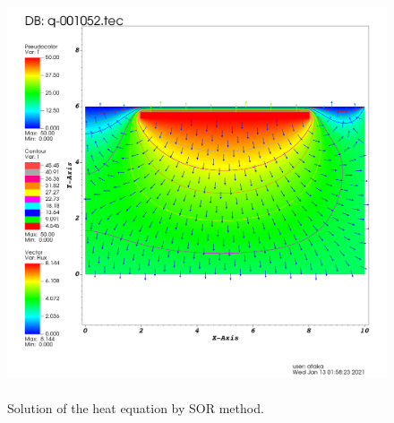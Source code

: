 \documentclass[letterpaper,12pt]{article}
\begin{document}
\begin{figure}[H] 
	\centering 
	\includegraphics[max height=12cm]{graphs/SOR_O19_rad_default/SOR_O19_rad_default.png}
	\caption{Solution of the heat equation by SOR method.}
 	\label{fig:sorrad}
\end{figure}
\end{document}
